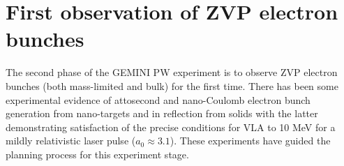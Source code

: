 \section{First observation of ZVP electron bunches}
The second phase of the GEMINI PW experiment is to observe ZVP electron bunches (both mass-limited and bulk) for the first time. There has been some experimental evidence of attosecond and nano-Coulomb electron bunch generation from nano-targets \cite{cardenasSubcycleDynamicsRelativistic2019,hornyGenerationSingleAttosecond2021} and in reflection from solids \cite{linIsolatedAttosecondElectron2020, thevenetVacuumLaserAcceleration2016} with the latter demonstrating satisfaction of the precise conditions for \ac{VLA} to 10 MeV for a mildly relativistic laser pulse ($a_0 \approx 3.1$). These experiments have guided the planning process for this experiment stage.

